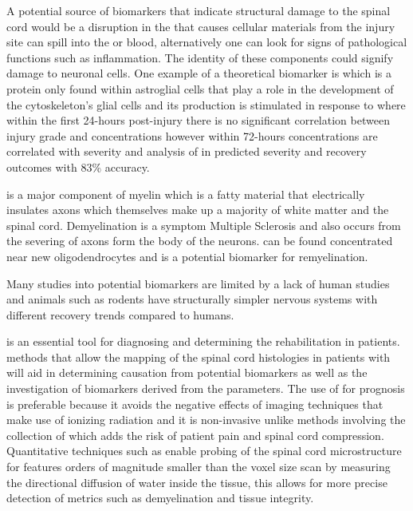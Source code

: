 A potential source of biomarkers that indicate structural damage to the spinal cord would be a disruption in the \bscb that causes cellular materials from the injury site can spill into the \csf or blood, alternatively one can look for signs of pathological functions such as inflammation. The identity of these components could signify damage to neuronal cells. One example of a theoretical biomarker is \gfap which is a protein only found within astroglial cells that play a role in the development of the cytoskeleton's glial cells and its production is stimulated in response to \sci where within the first 24-hours post-injury there is no significant correlation between injury grade and \gfap concentrations \cite{pouw2014structural} however within 72-hours \gfap concentrations are correlated with severity \cite{kwon2010cerebrospinal, ahadi2015diagnostic} and analysis of \gfap in \csf predicted \sci severity and recovery outcomes with 83\% accuracy. \cite{kwon2017cerebrospinal}

\mbp is a major component of myelin which is a fatty material that electrically insulates axons which themselves make up a majority of white matter and the spinal cord. Demyelination is a symptom Multiple Sclerosis and also occurs from the severing of axons form the body of the neurons. \mbp can be found concentrated near new oligodendrocytes and is a potential biomarker for remyelination. \cite{hesp2015chronic, zhang2011neurological}
\fi



Many studies into potential biomarkers are limited by a lack of human studies \cite{badhiwala2018review} and animals such as rodents have structurally simpler nervous systems with different recovery trends compared to humans. \cite{courtine2007can}
\fi

\mri is an essential tool for diagnosing and determining the rehabilitation \sci in patients. \mri methods that allow the mapping of the spinal cord histologies in patients with \sci will aid in determining causation from potential biomarkers as well as the investigation of biomarkers derived from the \mri parameters. \cite{freund2016embodied} The use of \mri for prognosis is preferable because it avoids the negative effects of imaging techniques that make use of ionizing radiation and it is non-invasive unlike methods involving the collection of \csf which adds the risk of patient pain and spinal cord compression. \cite{hrishi2019cerebrospinal} Quantitative \mri techniques such as \dmri enable probing of the spinal cord microstructure for features orders of magnitude smaller than the voxel size \mri scan by measuring the directional diffusion of water inside the tissue, this allows for more precise detection of metrics such as demyelination and tissue integrity. \cite{cohen2018microstructural, cadotte2018has, freund2013mri, seif2018quantitative}


